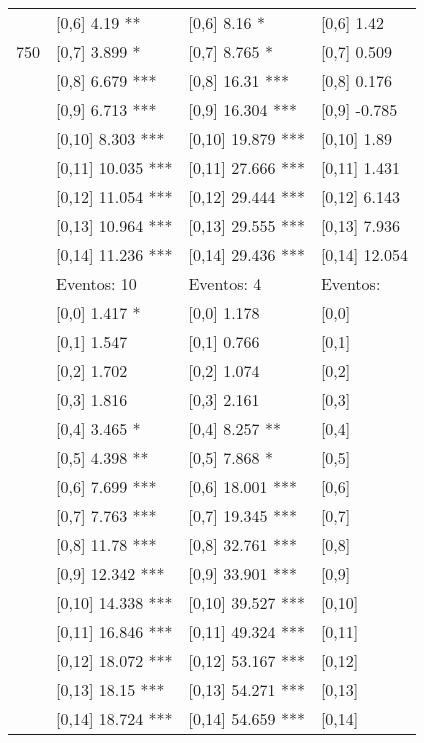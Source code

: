 \begin{table}
\begin{tabular}[t]{llll}
 & {}[0,6] 4.19 ** & {}[0,6] 8.16 * & {}[0,6] 1.42\\
750 & {}[0,7] 3.899 * & {}[0,7] 8.765 * & {}[0,7] 0.509\\
\addlinespace
 & {}[0,8] 6.679 *** & {}[0,8] 16.31 *** & {}[0,8] 0.176\\
 & {}[0,9] 6.713 *** & {}[0,9] 16.304 *** & {}[0,9] -0.785\\
 & {}[0,10] 8.303 *** & {}[0,10] 19.879 *** & {}[0,10] 1.89\\
 & {}[0,11] 10.035 *** & {}[0,11] 27.666 *** & {}[0,11] 1.431\\
 & {}[0,12] 11.054 *** & {}[0,12] 29.444 *** & {}[0,12] 6.143\\
\addlinespace
 & {}[0,13] 10.964 *** & {}[0,13] 29.555 *** & {}[0,13] 7.936\\
 & {}[0,14] 11.236 *** & {}[0,14] 29.436 *** & {}[0,14] 12.054\\
 & Eventos:  10 & Eventos:  4 & Eventos:\\
 & {}[0,0] 1.417 * & {}[0,0] 1.178 & {}[0,0]\\
 & {}[0,1] 1.547 & {}[0,1] 0.766 & {}[0,1]\\
\addlinespace
 & {}[0,2] 1.702 & {}[0,2] 1.074 & {}[0,2]\\
 & {}[0,3] 1.816 & {}[0,3] 2.161 & {}[0,3]\\
 & {}[0,4] 3.465 * & {}[0,4] 8.257 ** & {}[0,4]\\
 & {}[0,5] 4.398 ** & {}[0,5] 7.868 * & {}[0,5]\\
 & {}[0,6] 7.699 *** & {}[0,6] 18.001 *** & {}[0,6]\\
\addlinespace
1000 & {}[0,7] 7.763 *** & {}[0,7] 19.345 *** & {}[0,7]\\
 & {}[0,8] 11.78 *** & {}[0,8] 32.761 *** & {}[0,8]\\
 & {}[0,9] 12.342 *** & {}[0,9] 33.901 *** & {}[0,9]\\
 & {}[0,10] 14.338 *** & {}[0,10] 39.527 *** & {}[0,10]\\
 & {}[0,11] 16.846 *** & {}[0,11] 49.324 *** & {}[0,11]\\
\addlinespace
 & {}[0,12] 18.072 *** & {}[0,12] 53.167 *** & {}[0,12]\\
 & {}[0,13] 18.15 *** & {}[0,13] 54.271 *** & {}[0,13]\\
 & {}[0,14] 18.724 *** & {}[0,14] 54.659 *** & {}[0,14]\\
\bottomrule
\end{tabular}
\end{table}
